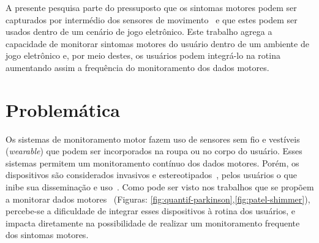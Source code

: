 A presente pesquisa parte do pressuposto que os sintomas motores podem ser capturados por intermédio dos sensores de movimento~\cite{visionbased2009,patel_monitoring_2009,bachlin_parkinsons_2009} e que estes podem ser usados dentro de um cenário de jogo eletrônico. Este trabalho agrega a capacidade de monitorar sintomas motores do usuário dentro de um ambiente de jogo eletrônico e, por meio destes, os usuários podem integrá-lo na rotina aumentando assim a frequência do monitoramento dos dados motores.


\section{Problemática}\label{section:problematica}
%

Os sistemas de monitoramento motor fazem uso de sensores sem fio e vestíveis (\textit{wearable}) que podem ser incorporados na roupa ou no corpo do usuário. Esses sistemas permitem um monitoramento contínuo dos dados motores. Porém, os dispositivos são considerados invasivos e estereotipados~\cite{aarh10}, pelos usuários o que inibe sua disseminação e uso~\cite{alemdar}. Como pode ser visto nos trabalhos que se propõem a monitorar dados motores~\cite{LeMoyne2009,patel_monitoring_2009} (Figuras: \ref{fig:quantif-parkinson},\ref{fig:patel-shimmer}), percebe-se a dificuldade de integrar esses dispositivos à rotina dos usuários, e impacta diretamente na possibilidade de realizar um monitoramento frequente dos sintomas motores.

